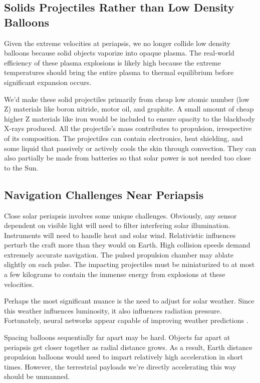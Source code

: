 \documentclass{article}
\begin{document}
{\subsection{Solids Projectiles Rather than Low Density Balloons}\label{sec:solid_balloons}
Given the extreme velocities at periapsis, we no longer collide low density balloons because solid objects vaporize into opaque plasma.   The real-world efficiency of these plasma explosions is likely high because the extreme temperatures should bring the entire plasma to thermal equilibrium before significant expansion occurs.

We'd make these solid projectiles primarily from cheap low atomic number (low Z) materials like boron nitride, motor oil, and graphite.  A small amount of cheap higher Z materials like iron would be included to ensure opacity to the blackbody X-rays produced.  
All the projectile's mass contributes to propulsion, irrespective of its composition.  The projectiles can contain electronics, heat shielding, and some liquid that passively or actively cools the skin through convection.     They can also partially be made from batteries so that solar power is not needed too close to the Sun.    

\subsection{Navigation Challenges Near Periapsis}\label{sec:periapsis_challenges}
Close solar periapsis involves some unique challenges.   Obviously, any sensor dependent on visible light will need to filter interfering solar illumination.   Instruments will need to handle heat and solar wind.  Relativistic influences perturb the craft more than they would on Earth.  High collision speeds demand extremely accurate navigation.   The pulsed propulsion chamber may ablate slightly on each pulse.  The impacting projectiles must be miniaturized to at most a few kilograms to contain the immense energy from explosions at these velocities. 

Perhaps the most significant nuance is the need to adjust for solar weather.  Since this weather influences luminosity, it also influences radiation pressure.   Fortunately, neural networks appear capable of improving weather predictions \cite{lam2023learning}.   

Spacing balloons sequentially far apart  may be hard.  Objects far apart at periapsis get closer together as radial distance grows.  As a result, Earth distance propulsion balloons would need to impart relatively high acceleration in short times.  However, the terrestrial payloads we're directly accelerating this way should be unmanned.   

}
\end{document}
